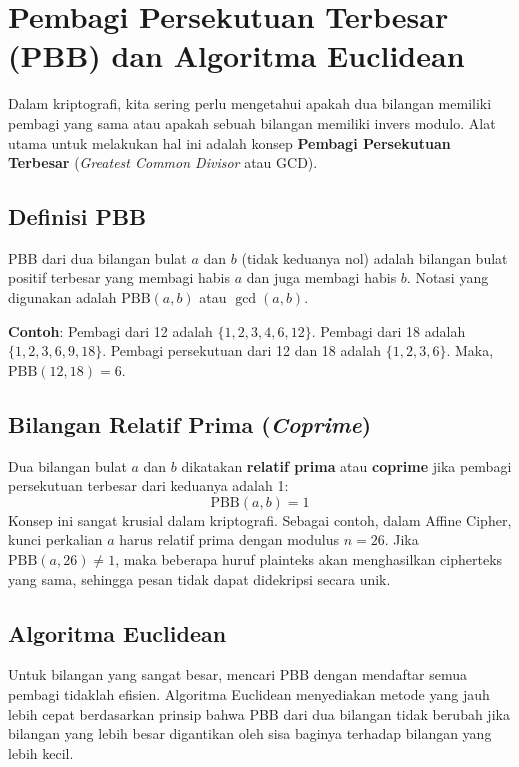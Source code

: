 \section{Pembagi Persekutuan Terbesar (PBB) dan Algoritma Euclidean}

Dalam kriptografi, kita sering perlu mengetahui apakah dua bilangan memiliki pembagi yang sama atau apakah sebuah bilangan memiliki invers modulo. Alat utama untuk melakukan hal ini adalah konsep \textbf{Pembagi Persekutuan Terbesar} (\textit{Greatest Common Divisor} atau GCD).

\subsection{Definisi PBB}

PBB dari dua bilangan bulat $a$ dan $b$ (tidak keduanya nol) adalah bilangan bulat positif terbesar yang membagi habis $a$ dan juga membagi habis $b$. Notasi yang digunakan adalah $\text{PBB}(a, b)$ atau $\gcd(a, b)$.

\textbf{Contoh}:
Pembagi dari 12 adalah $\{1, 2, 3, 4, 6, 12\}$.
Pembagi dari 18 adalah $\{1, 2, 3, 6, 9, 18\}$.
Pembagi persekutuan dari 12 dan 18 adalah $\{1, 2, 3, 6\}$.
Maka, $\text{PBB}(12, 18) = 6$.

\subsection{Bilangan Relatif Prima (\textit{Coprime})}

Dua bilangan bulat $a$ dan $b$ dikatakan \textbf{relatif prima} atau \textbf{coprime} jika pembagi persekutuan terbesar dari keduanya adalah 1:
\[ \text{PBB}(a, b) = 1 \]
Konsep ini sangat krusial dalam kriptografi. Sebagai contoh, dalam Affine Cipher, kunci perkalian $a$ harus relatif prima dengan modulus $n=26$. Jika $\text{PBB}(a, 26) \neq 1$, maka beberapa huruf plainteks akan menghasilkan cipherteks yang sama, sehingga pesan tidak dapat didekripsi secara unik.

\subsection{Algoritma Euclidean}

Untuk bilangan yang sangat besar, mencari PBB dengan mendaftar semua pembagi tidaklah efisien. Algoritma Euclidean menyediakan metode yang jauh lebih cepat berdasarkan prinsip bahwa PBB dari dua bilangan tidak berubah jika bilangan yang lebih besar digantikan oleh sisa baginya terhadap bilangan yang lebih kecil.


